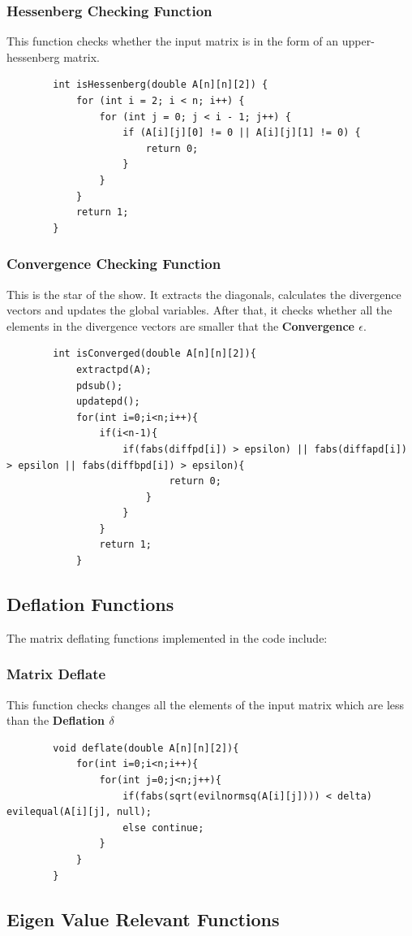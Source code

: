 \documentclass[12pt]{article}
\begin{document}
	\subsubsection{Hessenberg Checking Function}
	This function checks whether the input matrix is in the form of an upper-hessenberg matrix.
	\begin{lstlisting}
		int isHessenberg(double A[n][n][2]) {
			for (int i = 2; i < n; i++) {
				for (int j = 0; j < i - 1; j++) {
					if (A[i][j][0] != 0 || A[i][j][1] != 0) {
						return 0;
					}
				}
			}
			return 1;
		}
	\end{lstlisting}
	\subsubsection{Convergence Checking Function}
	This is the star of the show. It extracts the diagonals, calculates the divergence vectors and updates the global variables. After that, it checks whether all the elements in the divergence vectors are smaller that the \textbf{Convergence $\epsilon$}.
	\begin{lstlisting}
		int isConverged(double A[n][n][2]){
			extractpd(A);
			pdsub();
			updatepd();
			for(int i=0;i<n;i++){
				if(i<n-1){
					if(fabs(diffpd[i]) > epsilon) || fabs(diffapd[i]) > epsilon || fabs(diffbpd[i]) > epsilon){
							return 0;
						}
					}
				}
				return 1;
			}
	\end{lstlisting}
	\subsection{Deflation Functions}
	The matrix deflating functions implemented in the code include:
	
	\subsubsection{Matrix Deflate}
	This function checks changes all the elements of the input matrix which are less than the \textbf{Deflation $\delta$}
	\begin{lstlisting}
		void deflate(double A[n][n][2]){
			for(int i=0;i<n;i++){
				for(int j=0;j<n;j++){
					if(fabs(sqrt(evilnormsq(A[i][j]))) < delta) evilequal(A[i][j], null);
					else continue;
				}
			}		
		}
	\end{lstlisting}
	\subsection{Eigen Value Relevant Functions}
\end{document}
